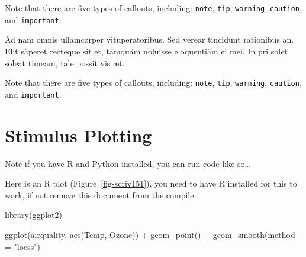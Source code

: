 \documentclass[
  12pt,
  a4paper,
  numbers=noenddot,
  titlepage,
  toclink=all,
  toc=bibliography]{scrbook}
\newenvironment{Shaded}{\begin{snugshade}}{\end{snugshade}}
\newcommand{\AttributeTok}[1]{\textcolor[rgb]{0.40,0.45,0.13}{#1}}
\newcommand{\FunctionTok}[1]{\textcolor[rgb]{0.28,0.35,0.67}{#1}}
\newcommand{\NormalTok}[1]{\textcolor[rgb]{0.00,0.23,0.31}{#1}}
\newcommand{\SpecialCharTok}[1]{\textcolor[rgb]{0.37,0.37,0.37}{#1}}
\newcommand{\StringTok}[1]{\textcolor[rgb]{0.13,0.47,0.30}{#1}}
\theoremstyle{plain}
\theoremstyle{plain}
\theoremstyle{definition}
\theoremstyle{plain}
\theoremstyle{definition}
\theoremstyle{definition}
\theoremstyle{plain}
\theoremstyle{plain}
\theoremstyle{remark}
\begin{document}
\begin{tcolorbox}[enhanced jigsaw, breakable, bottomrule=.15mm, rightrule=.15mm, title=\textcolor{quarto-callout-important-color}{\faExclamation}\hspace{0.5em}{Important}, colbacktitle=quarto-callout-important-color!10!white, colframe=quarto-callout-important-color-frame, colback=white, opacitybacktitle=0.6, arc=.35mm, left=2mm, toptitle=1mm, toprule=.15mm, titlerule=0mm, coltitle=black, bottomtitle=1mm, leftrule=.75mm, opacityback=0]

Note that there are five types of callouts, including: \texttt{note},
\texttt{tip}, \texttt{warning}, \texttt{caution}, and
\texttt{important}.

\end{tcolorbox}

Åd nam omnis ullamcørper vituperatoribus. Sed verear tincidunt
rationibus an. Elit såperet recteque sit et, tåmquåm noluisse
eloquentiåm ei mei. In pri solet soleat timeam, tale possit vis æt.

\begin{tcolorbox}[enhanced jigsaw, breakable, bottomrule=.15mm, rightrule=.15mm, title=\textcolor{quarto-callout-note-color}{\faInfo}\hspace{0.5em}{Note}, colbacktitle=quarto-callout-note-color!10!white, colframe=quarto-callout-note-color-frame, colback=white, opacitybacktitle=0.6, arc=.35mm, left=2mm, toptitle=1mm, toprule=.15mm, titlerule=0mm, coltitle=black, bottomtitle=1mm, leftrule=.75mm, opacityback=0]

Note that there are five types of callouts, including: \texttt{note},
\texttt{tip}, \texttt{warning}, \texttt{caution}, and
\texttt{important}.

\end{tcolorbox}

\hypertarget{sec-scriv151}{%
\section{Stimulus Plotting}\label{sec-scriv151}}

\protect\hypertarget{scriv151}{}{}

Note if you have R and Python installed, you can run code like
so\ldots{}

Here is an R plot
(\protect\hypertarget{cite_18}{}{\label{cite_18}Figure~\ref{fig-scriv151}}),
you need to have R installed for this to work, if not remove this
document from the compile:

\begin{Shaded}
\begin{Highlighting}[numbers=left,,]
\FunctionTok{library}\NormalTok{(ggplot2)}

\FunctionTok{ggplot}\NormalTok{(airquality, }\FunctionTok{aes}\NormalTok{(Temp, Ozone)) }\SpecialCharTok{+} 
  \FunctionTok{geom\_point}\NormalTok{() }\SpecialCharTok{+} 
  \FunctionTok{geom\_smooth}\NormalTok{(}\AttributeTok{method =} \StringTok{"loess"}\NormalTok{)}
\end{Highlighting}
\end{Shaded}
\end{document}

